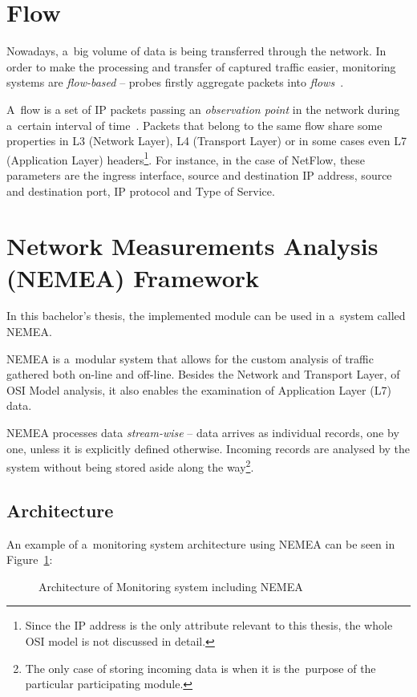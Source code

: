 \section{Flow}
Nowadays, a~big volume of data is being transferred through the network. In order to make the processing and
transfer of captured traffic easier, monitoring systems are \textit{flow-based} --  probes firstly aggregate packets
into \textit{flows}~\cite{flow}.

A~flow is a set of IP packets passing an \textit{observation point} in the network during a~certain interval of time~\cite{ipfix}.
Packets that belong to the same flow share some properties in L3 (Network Layer), L4 (Transport Layer) or in some cases even
L7 (Application Layer) headers\footnote{Since the IP address is the only
attribute relevant to this thesis, the whole OSI model is not discussed in detail.}.
For instance, in the case of NetFlow, these parameters are the ingress
interface, source and destination IP address, source and destination port, IP protocol and Type of Service.

\section{Network Measurements Analysis (NEMEA) Framework}\label{sec:nemea}
In this bachelor's thesis, the implemented module can be used in a~system called NEMEA.

NEMEA is a~modular system that allows for the custom analysis of traffic gathered both on-line and off-line.
Besides the Network and Transport Layer, of OSI Model analysis, it also enables the
examination of Application Layer (L7) data.

NEMEA processes data \textit{stream-wise} -- data arrives as individual records, one by one, unless it is explicitly defined otherwise.
Incoming records are analysed by the system without being stored aside along the way\footnote{The only case of storing incoming data is when it is
the~purpose of the particular participating module.}.

\subsection{Architecture}
An example of a~monitoring system architecture using NEMEA can be seen in Figure~\ref{fig:nemea_arch}:

\begin{figure}[ht]
   \begin{center}
		 \hfill
      \caption{Architecture of Monitoring system including NEMEA} \label{fig:nemea_arch}
	\end{center}
\end{figure}

